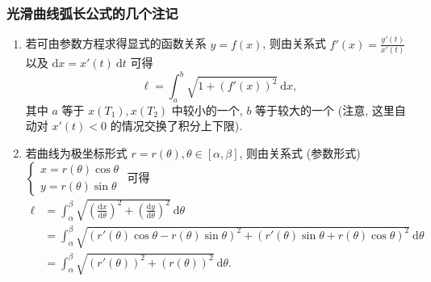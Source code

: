 \begin{frame}
\frametitle{光滑曲线弧长公式的几个注记}

\begin{enumerate}[<+->]
\item 若可由参数方程求得显式的函数关系 $y = f(x)$, 则由关系式 $f'(x) = \frac{y'(t)}{x'(t)}$ 以及 $\mathrm{d} x = x'(t) ~ \mathrm{d}t$ 可得
\[
\ell = \int_{a}^{b} \sqrt{1 + (f'(x))^2} ~ \mathrm{d} x,
\]
其中 $a$ 等于 $x(T_1), x(T_2)$ 中较小的一个, $b$ 等于较大的一个 (注意, 这里自动对 $x'(t) < 0$ 的情况交换了积分上下限).
\item 若曲线为极坐标形式 $r = r(\theta), \theta \in [\alpha, \beta]$, 则由关系式 (参数形式) $\begin{cases} x = r(\theta) \cos\theta \\[3pt] y = r(\theta) \sin\theta \end{cases}$ 可得
\begin{align*}
\ell & = \int_\alpha^\beta \sqrt{\left( \frac{\mathrm{d}x}{\mathrm{d}\theta} \right)^2 + \left( \frac{\mathrm{d}y}{\mathrm{d}\theta} \right)^2} ~ \mathrm{d}\theta \\
& = \int_\alpha^\beta \sqrt{\left( r'(\theta) \cos\theta - r(\theta) \sin\theta \right)^2 + \left( r'(\theta) \sin\theta + r(\theta) \cos\theta \right)^2} ~ \mathrm{d}\theta \\
& = \int_\alpha^\beta \sqrt{(r'(\theta))^2 + (r(\theta))^2} ~ \mathrm{d}\theta.
\end{align*}
\end{enumerate}

\end{frame}



